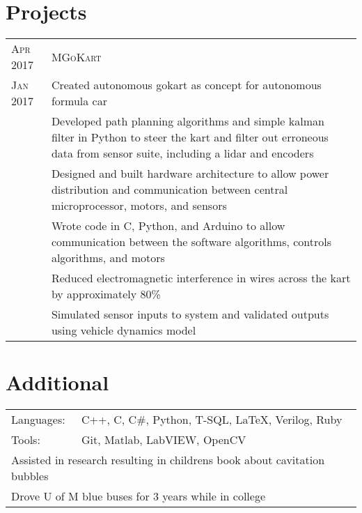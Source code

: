 \documentclass[a4paper,12pt]{article} %
\begin{document}

\section{Projects}

\begin{tabular}{R{2.1cm}|p{15.5cm}}
\hspace{4pt}\textsc{Apr 2017} & \textsc{MGoKart} \\
\textsc{Jan 2017} & \footnotesize{Created autonomous gokart as concept for
 autonomous formula car} \\
& \footnotesize{Developed path planning algorithms and simple kalman filter in
  Python to steer the kart and filter out erroneous data from sensor suite,
  including a lidar and encoders} \\
& \footnotesize{Designed and built hardware architecture to allow power
 distribution and communication between central microprocessor, motors, and
 sensors} \\
& \footnotesize{Wrote code in C, Python, and Arduino to allow communication
 between the software algorithms, controls algorithms, and motors} \\
& \footnotesize{Reduced electromagnetic interference in wires across the kart by
 approximately 80\%} \\
& \footnotesize{Simulated sensor inputs to system and validated outputs using
 vehicle dynamics model} \\
\end{tabular}


\section{Additional}

\begin{tabular}{ll}
Languages: & C++, C, C\#, Python, T-SQL, \LaTeX, Verilog, Ruby \\
Tools: & Git, Matlab, LabVIEW, OpenCV \\
\multicolumn{2}{l}{Assisted in research resulting in childrens book about
  cavitation bubbles}\\
\multicolumn{2}{l}{Drove U of M blue buses for 3 years while in college}\\
\end{tabular}

\clearpage %
\end{document}
